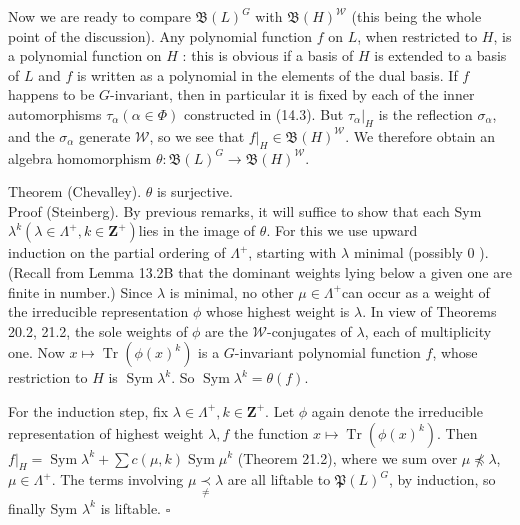 \documentclass[10pt]{article}
\begin{document}
Now we are ready to compare $\mathfrak{B}(L)^{G}$ with $\mathfrak{B}(H)^{\mathscr{W}}$ (this being the whole point of the discussion). Any polynomial function $f$ on $L$, when restricted to $H$, is a polynomial function on $H$ : this is obvious if a basis of $H$ is extended to a basis of $L$ and $f$ is written as a polynomial in the elements of the dual basis. If $f$ happens to be $G$-invariant, then in particular it is fixed by each of the inner automorphisms $\tau_{\alpha}(\alpha \in \Phi)$ constructed in (14.3). But $\left.\tau_{\alpha}\right|_{H}$ is the reflection $\sigma_{\alpha}$, and the $\sigma_{\alpha}$ generate $\mathscr{W}$, so we see that $\left.f\right|_{H} \in \mathfrak{B}(H)^{\mathscr{W}}$. We therefore obtain an algebra homomorphism $\theta: \mathfrak{B}(L)^{G} \rightarrow \mathfrak{B}(H)^{\mathscr{W}}$.

Theorem (Chevalley). $\theta$ is surjective.\\
Proof (Steinberg). By previous remarks, it will suffice to show that each Sym $\lambda^{k}\left(\lambda \in \Lambda^{+}, k \in \mathbf{Z}^{+}\right)$lies in the image of $\theta$. For this we use upward\\
induction on the partial ordering of $\Lambda^{+}$, starting with $\lambda$ minimal (possibly 0 ). (Recall from Lemma 13.2B that the dominant weights lying below a given one are finite in number.) Since $\lambda$ is minimal, no other $\mu \in \Lambda^{+}$can occur as a weight of the irreducible representation $\phi$ whose highest weight is $\lambda$. In view of Theorems 20.2, 21.2, the sole weights of $\phi$ are the $\mathscr{W}$-conjugates of $\lambda$, each of multiplicity one. Now $x \mapsto \operatorname{Tr}\left(\phi(x)^{k}\right)$ is a $G$-invariant polynomial function $f$, whose restriction to $H$ is $\operatorname{Sym} \lambda^{k}$. So $\operatorname{Sym} \lambda^{k}=\theta(f)$.

For the induction step, fix $\lambda \in \Lambda^{+}, k \in \mathbf{Z}^{+}$. Let $\phi$ again denote the irreducible representation of highest weight $\lambda, f$ the function $x \mapsto \operatorname{Tr}\left(\phi(x)^{k}\right)$. Then $\left.f\right|_{H}=\operatorname{Sym} \lambda^{k}+\sum c(\mu, k) \operatorname{Sym} \mu^{k}$ (Theorem 21.2), where we sum over $\mu \npreceq \lambda$, $\mu \in \Lambda^{+}$. The terms involving $\mu \underset{\neq}{\prec} \lambda$ are all liftable to $\mathfrak{P}(L)^{G}$, by induction, so finally Sym $\lambda^{k}$ is liftable. $\square$
\end{document}

